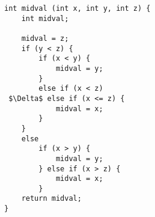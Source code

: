
\begin{minipage}{15cm}
\begin{lstlisting}[style=CStyle, caption=midval function returns the mid value between three integers., label=midval, mathescape=true]
int midval (int x, int y, int z) {
	int midval;

	midval = z;
	if (y < z) {
		if (x < y) {
			midval = y;
		}
		else if (x < z) 
 $\Delta$ else if (x <= z) {
			midval = x;	
		}
	}
	else 
		if (x > y) {
			midval = y;
		} else if (x > z) {
			midval = x;
		}
	return midval;
}
\end{lstlisting}
\end{minipage}